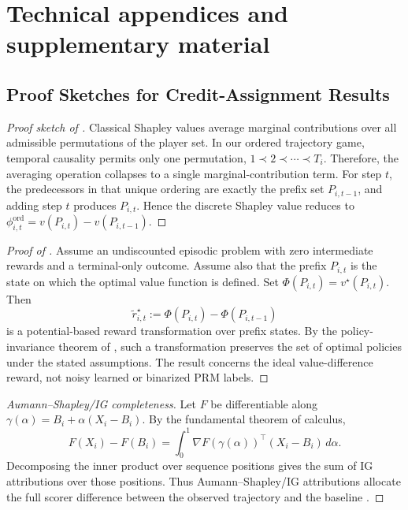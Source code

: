 \section{Technical appendices and supplementary material}
\label{sec:appendix}

\subsection{Proof Sketches for Credit-Assignment Results}
\label{sec:appendix_local_credit_proofs}

\begin{proof}[Proof sketch of ]
Classical Shapley values average marginal contributions over all admissible
permutations of the player set.
In our ordered trajectory game, temporal causality permits only one
permutation,
\(
1\prec 2\prec \cdots \prec T_i
\).
Therefore, the averaging operation collapses to a single marginal-contribution
term.
For step \(t\), the predecessors in that unique ordering are exactly the prefix
set \(P_{i,t-1}\), and adding step \(t\) produces \(P_{i,t}\).
Hence the discrete Shapley value reduces to
\(
\phi_{i,t}^{\mathrm{ord}}=v(P_{i,t})-v(P_{i,t-1})
\).
\end{proof}

\begin{proof}[Proof of ]
Assume an undiscounted episodic problem with zero intermediate rewards and a
terminal-only outcome.
Assume also that the prefix \(P_{i,t}\) is the state on which the optimal value
function is defined.
Set
\(
\Phi(P_{i,t})=v^\star(P_{i,t})
\).
Then
\[
\tilde r_{i,t}^\star
:=
\Phi(P_{i,t})-\Phi(P_{i,t-1})
\]
is a potential-based reward transformation over prefix states.
By the policy-invariance theorem of \citet{ng1999policy}, such a transformation
preserves the set of optimal policies under the stated assumptions.
The result concerns the ideal value-difference reward, not noisy learned or
binarized PRM labels.
\end{proof}

\begin{proof}[Aumann--Shapley/IG completeness]
Let \(F\) be differentiable along
\(\gamma(\alpha)=B_i+\alpha(X_i-B_i)\).
By the fundamental theorem of calculus,
\[
F(X_i)-F(B_i)
=
\int_0^1
\nabla F(\gamma(\alpha))^\top (X_i-B_i)
\,d\alpha .
\]
Decomposing the inner product over sequence positions gives the sum of IG
attributions over those positions.
Thus Aumann--Shapley/IG attributions allocate the full scorer difference between
the observed trajectory and the baseline
\citep{sundararajan2017axiomatic,pmlr-v119-sundararajan20b}.
\end{proof}

